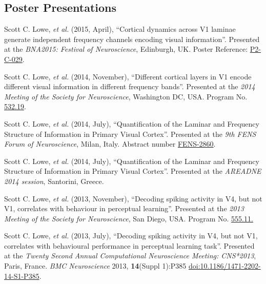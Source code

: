 \documentclass[11pt, a4paper]{article} %
\renewenvironment{itemize}{
  \begin{list}{}{
    \setlength{\leftmargin}{0em}
  }
}{
  \end{list}
}
\begin{document}
%
%
\subsection*{Poster Presentations}
%
%

\begin{itemize}
%
\item
Scott C. Lowe, \textit{et al.} (2015, April), ``Cortical dynamics across V1 laminae generate independent frequency channels encoding visual information''.
Presented at the \emph{BNA2015: Festival of Neuroscience}, Edinburgh, UK. Poster Reference: \href{http://www.bna.org.uk/static/docs/BNA2015/BNA2015-Abstract-Book.pdf}{P2-C-029}.
%
\item
Scott C. Lowe, \textit{et al.} (2014, November), ``Different cortical layers in V1 encode different visual information in different frequency bands''.
Presented at the \emph{2014 Meeting of the Society for Neuroscience}, Washington DC, USA. Program No. \href{http://www.abstractsonline.com/Plan/ViewAbstract.aspx?sKey=a018159d-9116-492d-b234-b4c53acd5260&cKey=e909b23c-40c3-4371-8816-345dfe3e6c3c&mKey=54c85d94-6d69-4b09-afaa-502c0e680ca7}{532.19}.
%
\item
Scott C. Lowe, \textit{et al.} (2014, July), ``Quantification of the Laminar and Frequency Structure of Information in Primary Visual Cortex''.
Presented at the \emph{9th FENS Forum of Neuroscience}, Milan, Italy. Abstract number \href{http://fens2014.meetingxpert.net/FENS_427/poster_102139/program.aspx}{FENS-2860}.
%
\item
Scott C. Lowe, \textit{et al.} (2014, July), ``Quantification of the Laminar and Frequency Structure of Information in Primary Visual Cortex''.
Presented at the \emph{AREADNE 2014 session}, Santorini, Greece.
%
\item
Scott C. Lowe, \textit{et al.} (2013, November), ``Decoding spiking activity in V4, but not V1, correlates with behaviour in perceptual learning''.
Presented at the \emph{2013 Meeting of the Society for Neuroscience}, San Diego, USA. Program No. \href{http://www.abstractsonline.com/Plan/ViewAbstract.aspx?sKey=a69ca081-1031-4c5e-917c-b57b7b7255cf&cKey=5e73e1d9-7177-4207-9890-3efb2a57985b&mKey=8d2a5bec-4825-4cd6-9439-b42bb151d1cf}{555.11.}
%
\item
Scott C. Lowe, \textit{et al.} (2013, July), ``Decoding spiking activity in V4, but not V1, correlates with behavioural performance in perceptual learning task''.
Presented at the \emph{Twenty Second Annual Computational Neuroscience Meeting: CNS*2013}, Paris, France.
\emph{BMC Neuroscience} 2013, \textbf{14}(Suppl 1):P385  \href{http://dx.doi.org/10.1186/1471-2202-14-S1-P385}{doi:10.1186/1471-2202-14-S1-P385}.
%
\end{itemize}
%
%
\end{document}
